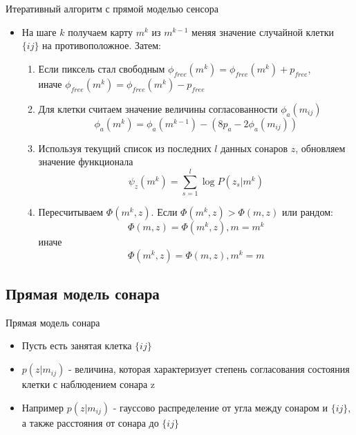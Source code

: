 \documentclass[9pt]{beamer}
\begin{document}
\begin{frame}{Итеративный алгоритм с прямой моделью сенсора}
\begin{itemize}
  \item
  {
    На шаге $k$ получаем карту $m^{k}$ из $m^{k-1}$ меняя значение случайной клетки $\{ij\}$ на противоположное. Затем:
    \begin{enumerate}
      \item
      {
        Если пиксель стал свободным $\phi_{free}(m^{k}) = \phi_{free}(m^{k}) + p_{free}$,\\ иначе $\phi_{free}(m^{k}) = \phi_{free}(m^{k}) - p_{free}$
      }
      \item
      {
        Для клетки считаем значение величины согласованности $\phi_a(m_{ij})$
        $$\phi_a(m^k) = \phi_a(m^{k-1}) - (8p_a - 2\phi_a(m_{ij}))$$
      }
      \item
      {
        Используя текущий список из последних $l$ данных сонаров $z$,  обновляем значение функционала $$\psi_{z}(m^{k}) = \sum_{s=1}^l \log{P(z_s|m^k)}$$
      }
      \item
      {
        Пересчитываем $\Phi(m^{k}, z)$. 
        Если $\Phi(m^{k}, z) > \Phi(m, z)$ или рандом:
        $$\Phi(m, z) = \Phi(m^{k}, z), m = m^k$$
        иначе
        $$\Phi(m^{k}, z) = \Phi(m, z), m^k = m $$
      }
    \end{enumerate}
  }
  \end{itemize}
\end{frame}


\subsection{Прямая модель сонара}

\begin{frame}{Прямая модель сонара}
\begin{itemize}
  \item
  {
    Пусть есть занятая клетка $\{ij\}$
  }
  \item
  {
    $p(z|m_{ij})$ - величина, которая характеризует степень согласования состояния клетки с наблюдением сонара z 
  }
  \item
  {
    Например $p(z|m_{ij})$ - гауссово распределение от угла между сонаром и $\{ij\}$, а также расстояния от сонара до $\{ij\}$
  }
\end{itemize}
\end{frame}
\end{document}
